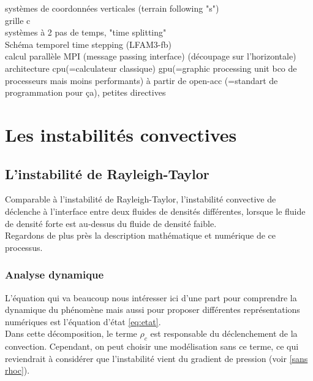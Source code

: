 \documentclass{rapportECC}
\begin{document}
systèmes de coordonnées verticales (terrain following "s")\\
grille c\\
systèmes à 2 pas de temps, "time splitting" \\
Schéma temporel time stepping (LFAM3-fb)\\

calcul parallèle MPI (message passing interface) (découpage sur l'horizontale) \\
architecture cpu(=calculateur classique) gpu(=graphic processing unit bco de processeurs mais moins performants)  à partir de open-acc (=standart de programmation pour ça), petites directives\\


\section{Les instabilités convectives}
\subsection{L'instabilité de Rayleigh-Taylor}

Comparable à l'instabilité de Rayleigh-Taylor, l'instabilité convective de déclenche à l'interface entre deux fluides de densités différentes, lorsque le fluide de densité forte est au-dessus du fluide de densité faible. \\ 
Regardons de plus près la description mathématique et numérique de ce processus.

\subsubsection{Analyse dynamique}

L'équation qui va beaucoup nous intéresser ici d'une part pour comprendre la dynamique du phénomène mais aussi pour proposer différentes représentations numériques est l'équation d'état \eqref{eq:etat}. \\
\vspace{0.5 cm}
Dans cette décomposition, le terme $\rho_c$ est responsable du déclenchement de la convection. Cependant, on peut choisir une modélisation sans ce terme, ce qui reviendrait à considérer que l'instabilité vient du gradient de pression (voir \ref{sans rhoc}).
\end{document}
